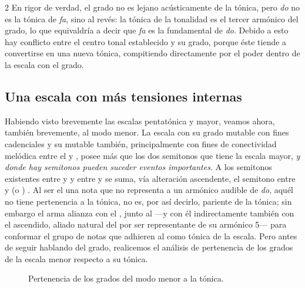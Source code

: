 \documentclass[a4paper,11pt]{article}
\begin{document}
\begin{multicols}{2}
    En rigor de verdad, el  grado no es lejano acústicamente de la tónica, pero \emph{do} no es la tónica de \emph{fa}, sino al revés: la tónica de la tonalidad es el tercer armónico del  grado, lo que equivaldría a decir que \emph{fa} es la fundamental de \emph{do}. Debido a esto hay conflicto entre el centro tonal establecido y su  grado, porque éste tiende a convertirse en una nueva tónica, compitiendo directamente por el poder dentro de la escala con el  grado.

    \subsection{Una escala con más tensiones internas}\label{subsec:esc-mas-tensiones}
    Habiendo visto brevemente las escalas pentatónica y mayor, veamos ahora, también brevemente, al modo menor. La escala  con su  grado mutable con fines cadenciales y su  mutable también, principalmente con fines de conectividad melódica entre el  y , posee más que los dos semitonos que tiene la escala mayor, \emph{y donde hay semitonos pueden suceder eventos importantes}. A los semitonos existentes entre  y  y entre  y  se suma, vía alteración ascendente, el semitono entre  y  (o ) \hbox{.} Al ser el  una nota que no representa a un armónico audible de \emph{do}, aquél no tiene pertenencia a la tónica, no es, por así decirlo, pariente de la tónica; sin embargo el  arma alianza con el , junto al  ---y con él indirectamente también con el  ascendido, aliado natural del  por ser representante de su armónico 5--- para conformar el grupo de notas que adhieren al  como tónica de la escala. Pero antes de seguir hablando del  grado, realicemos el análisis de pertenencia de los grados de la escala menor respecto a su tónica.
\end{multicols}

\begin{figure}[H]
\centering
\caption{Pertenencia de los grados del modo menor a la tónica.}\label{fig:pertenencia-menor}
\end{figure}
\end{document}
